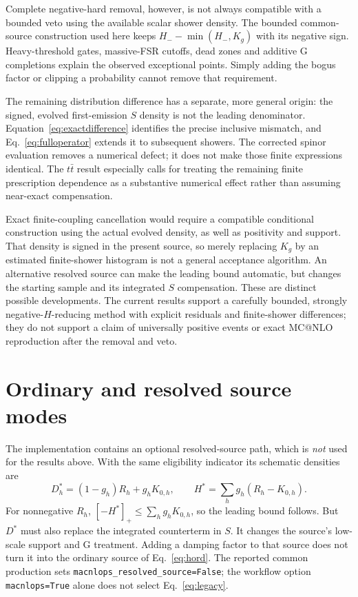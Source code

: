 \documentclass[11pt,a4paper]{article}
\makeatletter
\newcommand{\mcatnlo}{MC@NLO}
\newcommand{\pos}[1]{\left[#1\right]_+}
\newcommand{\code}[1]{\texttt{\small #1}}
\makeatother
\begin{document}
Complete negative-hard removal, however, is not always compatible
with a bounded veto using the available scalar shower density. The
bounded common-source construction used here keeps $H_--\min(H_-,K_g)$ with its
negative sign. Heavy-threshold gates, massive-FSR cutoffs, dead zones
and additive G completions explain the observed exceptional points.
Simply adding the bogus factor or clipping a probability cannot
remove that requirement.

The remaining distribution difference has a separate, more general
origin: the signed, evolved first-emission $S$ density is not the
leading denominator. Equation~\eqref{eq:exactdifference} identifies
the precise inclusive mismatch, and Eq.~\eqref{eq:fulloperator}
extends it to subsequent showers. The corrected spinor evaluation
removes a numerical defect; it does not make those finite expressions
identical. The $t\bar t$ result especially calls for treating the
remaining finite prescription dependence as a substantive numerical
effect rather than assuming near-exact compensation.

Exact finite-coupling cancellation would require a compatible
conditional construction using the actual evolved density, as well
as positivity and support. That density is signed in the present
source, so merely replacing $K_g$ by an estimated finite-shower
histogram is not a general acceptance algorithm. An alternative
resolved source can make the leading bound automatic, but changes
the starting sample and its integrated $S$ compensation. These are
distinct possible developments. The current results support a
carefully bounded, strongly negative-$H$-reducing method with explicit
residuals and finite-shower differences; they do not support a claim
of universally positive events or exact \mcatnlo{} reproduction after
the removal and veto.

\appendix
\section{Ordinary and resolved source modes}
The implementation contains an optional resolved-source path, which
is \emph{not} used for the results above. With the same eligibility
indicator its schematic densities are
\begin{equation}
 D_h^*=(1-g_h)R_h+g_hK_{0,h},\qquad
 H^*=\sum_hg_h(R_h-K_{0,h}).
 \label{eq:legacy}
\end{equation}
For nonnegative $R_h$, $\pos{-H^*}\le\sum_hg_hK_{0,h}$, so the leading
bound follows. But $D^*$ must also replace the integrated counterterm
in $S$. It changes the source's low-scale support and G treatment.
Adding a damping factor to that source does not turn it into the
ordinary source of Eq.~\eqref{eq:hord}. The reported common production
sets \code{macnlops\_resolved\_source=False}; the workflow option
\code{macnlops=True} alone does not select Eq.~\eqref{eq:legacy}.
\end{document}
